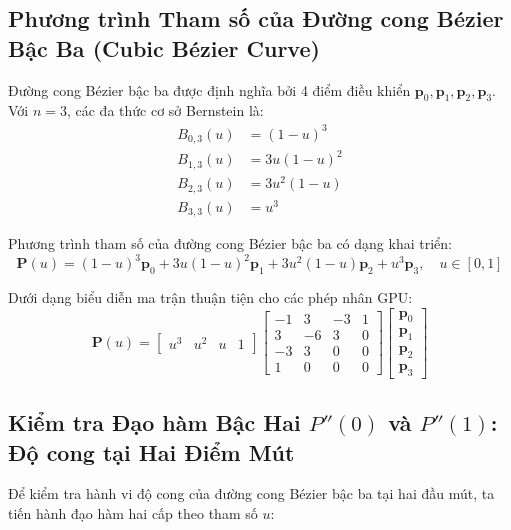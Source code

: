 \subsection{Phương trình Tham số của Đường cong Bézier Bậc Ba (Cubic Bézier Curve)}

Đường cong Bézier bậc ba được định nghĩa bởi 4 điểm điều khiển $\mathbf{p}_0, \mathbf{p}_1, \mathbf{p}_2, \mathbf{p}_3$. Với $n = 3$, các đa thức cơ sở Bernstein là:
\begin{align}
B_{0, 3}(u) &= (1 - u)^3 \\
B_{1, 3}(u) &= 3u(1 - u)^2 \\
B_{2, 3}(u) &= 3u^2(1 - u) \\
B_{3, 3}(u) &= u^3
\end{align}

Phương trình tham số của đường cong Bézier bậc ba có dạng khai triển:
\begin{equation}
\mathbf{P}(u) = (1 - u)^3 \mathbf{p}_0 + 3u(1 - u)^2 \mathbf{p}_1 + 3u^2(1 - u) \mathbf{p}_2 + u^3 \mathbf{p}_3, \quad u \in [0, 1]
\end{equation}

Dưới dạng biểu diễn ma trận thuận tiện cho các phép nhân GPU:
\begin{equation}
\mathbf{P}(u) = \begin{bmatrix} u^3 & u^2 & u & 1 \end{bmatrix} \begin{bmatrix} -1 & 3 & -3 & 1 \\ 3 & -6 & 3 & 0 \\ -3 & 3 & 0 & 0 \\ 1 & 0 & 0 & 0 \end{bmatrix} \begin{bmatrix} \mathbf{p}_0 \\ \mathbf{p}_1 \\ \mathbf{p}_2 \\ \mathbf{p}_3 \end{bmatrix}
\end{equation}

\subsection{Kiểm tra Đạo hàm Bậc Hai \texorpdfstring{$P''(0)$ và $P''(1)$}{P''(0) và P''(1)}: Độ cong tại Hai Điểm Mút}

Để kiểm tra hành vi độ cong của đường cong Bézier bậc ba tại hai đầu mút, ta tiến hành đạo hàm hai cấp theo tham số $u$:

